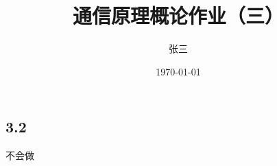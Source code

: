 \documentclass[11pt]{article}
\begin{document}
\begin{CJK}{UTF8}{gbsn}
\title{通信原理概论作业（三）}
\author{张三}
\date{\today}
\maketitle
\section*{3.2}
不会做
\end{CJK}
\end{document}
